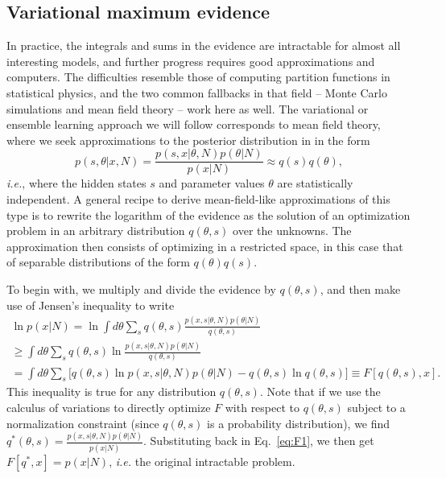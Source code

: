 
\subsection{Variational maximum evidence}
In practice, the integrals and sums in the evidence are intractable
for almost all interesting models, and further progress requires good
approximations and computers. The difficulties resemble those of
computing partition functions in statistical physics, and the two
common fallbacks in that field -- Monte Carlo
simulations \cite{Green1995,Robert2000,Mackay2003} and mean field
theory \cite{Mackay1997,Mackay2003,Bishop2006} -- work here as well.
The variational or ensemble learning approach we will follow corresponds to
mean field theory, where we seek approximations to the
posterior distribution in  in the form
\begin{equation}
p(s,\theta|x,N)=\frac{p(s,x|\theta,N)p(\theta|N)}{p(x|N)}
\approx q(s)q(\theta),
\end{equation}
\textit{i.e.}, where the hidden states $s$ and parameter values $\theta$ are
statistically independent.  A general recipe to derive mean-field-like
approximations of this type\cite{Mackay2003} is to rewrite the
logarithm of the evidence as the solution of an optimization problem
in an arbitrary distribution $q(\theta,s)$ over the unknowns. The
approximation then consists of optimizing in a restricted space, in
this case that of separable distributions of the form $q(\theta)q(s)$.

To begin with, we multiply and divide the evidence by $q(\theta,s)$,
and then make use of Jensen's inequality to write
\begin{multline}\label{eq:F1}
\ln p(x|N)=\ln \int d\theta\sum_s 
    q(\theta,s)\frac{p(x,s|\theta,N)p(\theta|N)}{q(\theta,s)}\\
    \ge \int d\theta\sum_s q(\theta,s) 
    \ln \frac{p(x,s|\theta,N)p(\theta|N)}{q(\theta,s)}\\
    =\int d\theta\sum_s \Big[
    q(\theta,s) \ln p(x,s|\theta,N)p(\theta|N)
    -q(\theta,s) \ln q(\theta,s)
    \Big]\equiv F[q(\theta,s),x].
\end{multline}
This inequality is true for any distribution $q(\theta,s)$. Note that
if we use the calculus of variations to directly optimize $F$ with
respect to $q(\theta,s)$ subject to a normalization constraint (since
$q(\theta,s)$ is a probability distribution), we find
$q^*(\theta,s)=\frac{p(x,s|\theta,N)p(\theta|N)}{p(x|N)}$. Substituting
back in Eq.~\eqref{eq:F1}, we then get
$F[q^*,x]=p(x|N)$, \textit{i.e.} the original intractable problem.

